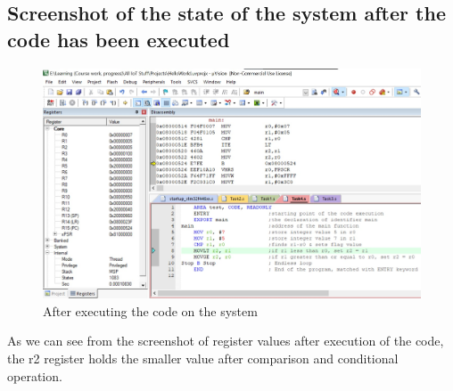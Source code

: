 \documentclass[footheight=20pt, footsepline, headheight=20pt, headsepline]{scrartcl}
\begin{document}
\subsection*{Screenshot of the state of the system after the code has been executed}
\begin{figure}[ht]
    \centering
    \includegraphics[scale=.7]{images/Task4After1.jpg}
    \caption{After executing the code on the system}
    \label{fig:after_task_four}
\end{figure}
\FloatBarrier
As we can see from the screenshot of register values after execution of the code, the r2 register holds the smaller value after comparison and conditional operation.
\end{document}
